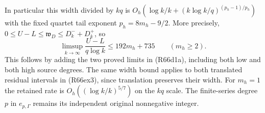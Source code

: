 In particular this width divided by $kq$ is
$O_h(\log k/k+(k\log k/q)^{(p_h-1)/p_h})$ with the fixed
quartet tail exponent $p_h=8m_h-9/2$. More precisely,
$0\leq U-L\leq\mathfrak w_D\leq D_k^-+D_k^+$, so
\[
 \limsup_{k\to\infty}\frac{U-L}{q\log k}
 \leq192m_h+735\qquad(m_h\geq2).
 \tag{R66ex3a}
\]
This follows by adding the two proved limits in (R66d1a),
including both low and both high source degrees. The same
width bound applies to both translated residual intervals
in (R66ex3), since translation preserves their width.
For $m_h=1$ the retained rate is
$O_h((\log k/k)^{5/7})$ on the $kq$ scale. The finite-series
degree $p$ in $e_{p,\Gamma}$ remains its independent original
nonnegative integer.